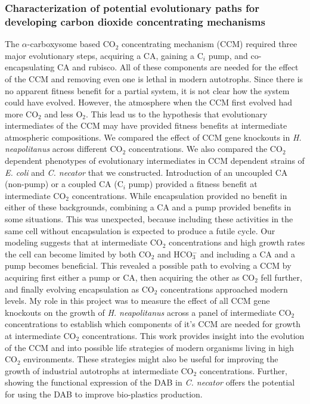 \documentclass{article}
\begin{document}
\subsubsection{Characterization of potential evolutionary paths for developing carbon dioxide concentrating mechanisms} \label{CCM_EVO_COMBINED}
The $\alpha$-carboxysome based CO$_2$ concentrating mechanism (CCM) required three major evolutionary steps, acquiring a CA, gaining a C$_i$ pump, and co-encapsulating CA and rubisco.
All of these components are needed for the effect of the CCM and removing even one is lethal in modern autotrophs.
Since there is no apparent fitness benefit for a partial system, it is not clear how the system could have evolved.
However, the atmosphere when the CCM first evolved had more CO$_2$ and less O$_2$.
This lead us to the hypothesis that evolutionary intermediates of the CCM may have provided fitness benefits at intermediate atmospheric compositions.
We compared the effect of CCM gene knockouts in \textit{H. neapolitanus} across different CO$_2$ concentrations.
We also compared the CO$_2$ dependent phenotypes of evolutionary intermediates in CCM dependent strains of \textit{E. coli} and \textit{C. necator} that we constructed.
Introduction of an uncoupled CA (non-pump) or a coupled CA (C$_i$ pump) provided a fitness benefit at intermediate CO$_2$ concentrations.
While encapsulation provided no benefit in either of these backgrounds, combining a CA and a pump provided benefits in some situations. 
This was unexpected, because including these activities in the same cell without encapsulation is expected to produce a futile cycle.
Our modeling suggests that at intermediate CO$_2$ concentrations and high growth rates the cell can become limited by both CO$_2$ and HCO$_{3}^{-}$ and including a CA and a pump becomes beneficial.
This revealed a possible path to evolving a CCM by acquiring first either a pump or CA, then acquiring the other as CO$_2$ fell further, and finally evolving encapsulation as CO$_2$ concentrations approached modern levels.
My role in this project was to measure the effect of all CCM gene knockouts on the growth of \textit{H. neapolitanus} across a panel of intermediate CO$_2$ concentrations to establish which components of it's CCM are needed for growth at intermediate CO$_2$ concentrations.
This work provides insight into the evolution of the CCM and into possible life strategies of modern organisms living in high CO$_2$ environments.
These strategies might also be useful for improving the growth of industrial autotrophs at intermediate CO$_2$ concentrations.
Further, showing the functional expression of the DAB in \textit{C. necator} offers the potential for using the DAB to improve bio-plastics production.
\end{document}
